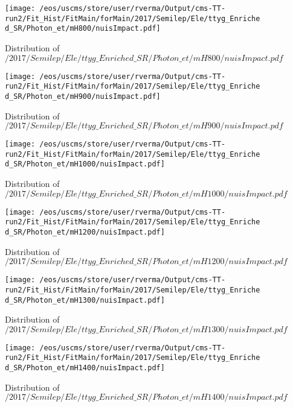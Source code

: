 \begin{figure}
\centering
\texttt{[image: /eos/uscms/store/user/rverma/Output/cms-TT-run2/Fit\_Hist/FitMain/forMain/2017/Semilep/Ele/ttyg\_Enriched\_SR/Photon\_et/mH800/nuisImpact.pdf]}
\caption{Distribution of $/2017/Semilep/Ele/ttyg\_Enriched\_SR/Photon\_et/mH800/nuisImpact.pdf$}
\end{figure}

\begin{figure}
\centering
\texttt{[image: /eos/uscms/store/user/rverma/Output/cms-TT-run2/Fit\_Hist/FitMain/forMain/2017/Semilep/Ele/ttyg\_Enriched\_SR/Photon\_et/mH900/nuisImpact.pdf]}
\caption{Distribution of $/2017/Semilep/Ele/ttyg\_Enriched\_SR/Photon\_et/mH900/nuisImpact.pdf$}
\end{figure}

\begin{figure}
\centering
\texttt{[image: /eos/uscms/store/user/rverma/Output/cms-TT-run2/Fit\_Hist/FitMain/forMain/2017/Semilep/Ele/ttyg\_Enriched\_SR/Photon\_et/mH1000/nuisImpact.pdf]}
\caption{Distribution of $/2017/Semilep/Ele/ttyg\_Enriched\_SR/Photon\_et/mH1000/nuisImpact.pdf$}
\end{figure}

\begin{figure}
\centering
\texttt{[image: /eos/uscms/store/user/rverma/Output/cms-TT-run2/Fit\_Hist/FitMain/forMain/2017/Semilep/Ele/ttyg\_Enriched\_SR/Photon\_et/mH1200/nuisImpact.pdf]}
\caption{Distribution of $/2017/Semilep/Ele/ttyg\_Enriched\_SR/Photon\_et/mH1200/nuisImpact.pdf$}
\end{figure}

\begin{figure}
\centering
\texttt{[image: /eos/uscms/store/user/rverma/Output/cms-TT-run2/Fit\_Hist/FitMain/forMain/2017/Semilep/Ele/ttyg\_Enriched\_SR/Photon\_et/mH1300/nuisImpact.pdf]}
\caption{Distribution of $/2017/Semilep/Ele/ttyg\_Enriched\_SR/Photon\_et/mH1300/nuisImpact.pdf$}
\end{figure}

\begin{figure}
\centering
\texttt{[image: /eos/uscms/store/user/rverma/Output/cms-TT-run2/Fit\_Hist/FitMain/forMain/2017/Semilep/Ele/ttyg\_Enriched\_SR/Photon\_et/mH1400/nuisImpact.pdf]}
\caption{Distribution of $/2017/Semilep/Ele/ttyg\_Enriched\_SR/Photon\_et/mH1400/nuisImpact.pdf$}
\end{figure}

